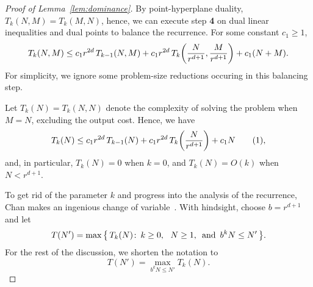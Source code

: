 \begin{proof}[Proof of Lemma~\ref{lem:dominance}]
By point-hyperplane duality, $T_k(N,M) = T_k(M,N)$, hence, we can execute
step \textbf{4} on dual linear inequalities and dual points to balance the
recurrence. For some constant $c_1 \ge 1$,
\begin{displaymath}
	T_k(N,M)
	\le
	c_1 r^{2d} \,T_{k-1}(N,M)
	+
	c_1 r^{2d} \,T_k\mleft(\frac{N}{r^{d+1}},\frac{M}{r^{d+1}}\mright)
	+
	c_1 (N+M).
\end{displaymath}
For simplicity, we ignore some problem-size
reductions occuring in this balancing step.

Let $T_k(N) = T_k(N,N)$ denote the complexity of solving the problem when
$M=N$, excluding the output cost. Hence, we have
\begin{displaymath}
	T_k(N)
	\le
	c_1 r^{2d} \,T_{k-1}(N)
	+
	c_1 r^{2d} \,T_k\mleft(\frac{N}{r^{d+1}}\mright)
	+
	c_1 N \addtocounter{equation}{1}\tag{\theequation} \label{eq:tkn},
\end{displaymath}
and, in particular,
\(T_k(N) = 0\) when \(k=0\),
and
\(T_k(N) = O(k)\) when \(N < r^{d+1}\).

To get rid of the parameter $k$ and progress into the analysis of the
recurrence, Chan makes an ingenious change of variable~\cite{Cha08}.
With hindsight,
choose $b = r^{d+1}$ and let
\begin{equation}\label{eq:tn'}
	T(N') = \max\,
	\mleft\{\,
		T_k(N) \colon\, k \geq 0,\,\,\,\, N \geq 1,~\text{\,and\,}~b^k N\le N'
	\,\mright\}.
\end{equation}
For the rest of the discussion, we shorten the notation to
\begin{displaymath}
	T(N') = \max_{b^k N\le N'} T_k(N).
\end{displaymath}


\end{proof}

